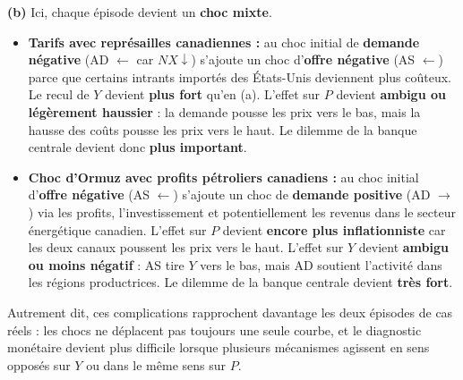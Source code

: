 \begin{reponse}
\textbf{(b)} Ici, chaque épisode devient un \textbf{choc mixte}.
\begin{itemize}
   \item \textbf{Tarifs avec représailles canadiennes :} au choc initial de \textbf{demande négative} (AD $\leftarrow$ car $NX \downarrow$) s'ajoute un choc d'\textbf{offre négative} (AS $\leftarrow$) parce que certains intrants importés des États-Unis deviennent plus coûteux. Le recul de $Y$ devient \textbf{plus fort} qu'en (a). L'effet sur $P$ devient \textbf{ambigu ou légèrement haussier} : la demande pousse les prix vers le bas, mais la hausse des coûts pousse les prix vers le haut. Le dilemme de la banque centrale devient donc \textbf{plus important}.
   \item \textbf{Choc d'Ormuz avec profits pétroliers canadiens :} au choc initial d'\textbf{offre négative} (AS $\leftarrow$) s'ajoute un choc de \textbf{demande positive} (AD $\rightarrow$) via les profits, l'investissement et potentiellement les revenus dans le secteur énergétique canadien. L'effet sur $P$ devient \textbf{encore plus inflationniste} car les deux canaux poussent les prix vers le haut. L'effet sur $Y$ devient \textbf{ambigu ou moins négatif} : AS tire $Y$ vers le bas, mais AD soutient l'activité dans les régions productrices. Le dilemme de la banque centrale devient \textbf{très fort}.
\end{itemize}
Autrement dit, ces complications rapprochent davantage les deux épisodes de cas réels : les chocs ne déplacent pas toujours une seule courbe, et le diagnostic monétaire devient plus difficile lorsque plusieurs mécanismes agissent en sens opposés sur $Y$ ou dans le même sens sur $P$.
\end{reponse}


